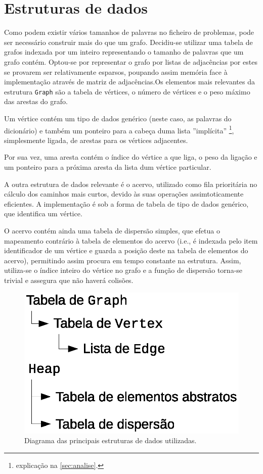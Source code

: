 \documentclass[a4paper, 18pt]{article}
\begin{document}
\section{Estruturas de dados}
	\par
	Como podem existir vários tamanhos de palavras no ficheiro de problemas, 
pode ser necessário construir mais do que um grafo. Decidiu-se utilizar uma 
tabela de grafos indexada por um inteiro representando o tamanho de palavras que 
um grafo contém. Optou-se por representar o grafo por listas de adjacências por 
estes se provarem ser relativamente esparsos, poupando assim memória face à 
implementação através de matriz de adjacências.Os elementos mais relevantes da 
estrutura \texttt{Graph} são a tabela de vértices, o número de vértices e o peso 
máximo das arestas do grafo.
	\par
	Um vértice contém um tipo de dados genérico (neste caso, as palavras do 
dicionário) e também um ponteiro para a cabeça duma lista ''implícita'' 
\footnote{explicação na \autoref{sec:analise}.}, simplesmente ligada, de arestas 
para os vértices adjacentes.
	\par
	Por sua vez, uma aresta contém o índice do vértice a que liga, o peso da 
ligação e um ponteiro para a próxima aresta da lista dum vértice particular.
	\par\null\par
	A outra estrutura de dados relevante é o acervo, utilizado como fila 
prioritária no cálculo dos caminhos mais curtos, devido às suas operações 
assimtoticamente eficientes. A implementação é sob a forma de tabela de tipo de 
dados genérico, que identifica um vértice.
	\par
	O acervo contém ainda uma tabela de dispersão simples, que efetua o 
mapeamento contrário à tabela de elementos do acervo (i.e., é indexada pelo item 
identificador de um vértice e guarda a posição deste na tabela de elementos do 
acervo), permitindo assim procura em tempo constante na estrutura. Assim, 
utiliza-se o índice inteiro do vértice no grafo e a função de dispersão torna-se 
trivial e assegura que não haverá colisões.
	\begin{figure}[H]
		\centering
		\includegraphics[width=0.4\linewidth]{data}
		\caption{Diagrama das principais estruturas de dados utilizadas.}
	\end{figure}
\end{document}

